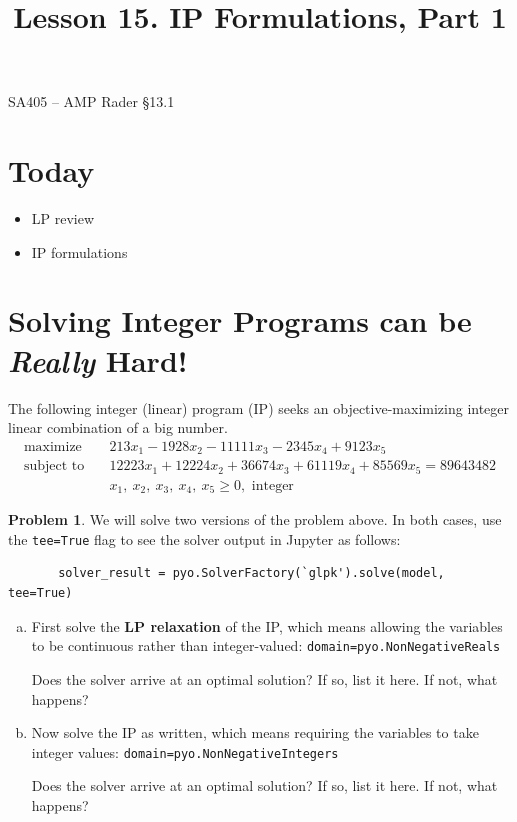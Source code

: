 \documentclass[11pt]{article}
\makeatletter
\renewcommand{\labelitemi}{$\bullet$}
\theoremstyle{definition}
\newtheorem{problem}{Problem}
\newcommand{\answerbox}[3]{%
  \fbox{%
    \begin{minipage}[#1]{#2}
      \hfill\vspace{#3}
    \end{minipage}
  }
}
\newcommand{\answerboxone}[2]{%
  \answerbox{#1}{6.0in}{#2} 
}
\newcommand{\maximize}{\text{maximize}}
\newcommand{\subjectto}{\text{subject to}}
\renewcommand{\maketitle}{
  \noindent SA405 -- AMP \hfill Rader \S 13.1  \\

  \begin{center}\Large{\textbf{\@title}}\end{center}
}
\makeatother
\begin{document}
  
\title{Lesson 15.  IP Formulations, Part 1}

\maketitle

\section{Today}
\renewcommand\labelitemi{--}
\begin{itemize}
\item  LP review
\item  IP formulations
\end{itemize}

\section{Solving Integer Programs can be \emph{Really} Hard!}

The following integer (linear) program (IP) seeks an objective-maximizing integer linear combination of a big number. 
\begin{align*}
      \maximize \quad & 213x_1 - 1928x_2 - 11111x_3 - 2345x_4 + 9123x_5
\\
      \subjectto \quad & 12223x_1 + 12224x_2 + 36674x_3 + 61119x_4 + 85569x_5 = 89643482\\
                       & x_1,~x_2,~x_3,~x_4,~x_5 \ge 0, \text{ integer }
\end{align*}

\begin{problem}
We will solve two versions of the problem above.  
In both cases, use the \texttt{tee=True} flag to see the solver output in Jupyter as follows:

\vspace{-.5cm}
\begin{verbatim}
       solver_result = pyo.SolverFactory(`glpk').solve(model, tee=True)
\end{verbatim}

\begin{enumerate}[(a)]
\item  First solve the \textbf{LP relaxation} of the IP, which means allowing the variables to be continuous rather than integer-valued:  \texttt{domain=pyo.NonNegativeReals}

Does the solver arrive at an optimal solution? If so, list it here.  If not, what happens? \\ 
\answerboxone{c}{.5in}
\item Now solve the IP as written, which means requiring the variables to take integer values:  \texttt{domain=pyo.NonNegativeIntegers}

Does the solver arrive at an optimal solution? If so, list it here.  If not, what happens? \\ 
\answerboxone{c}{.5in}
\end{enumerate}
\end{problem}
\end{document}
